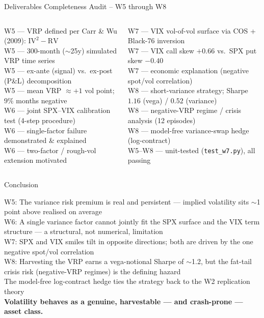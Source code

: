 \documentclass[aspectratio=169, 11pt]{beamer}
\begin{document}
\begin{frame}{Deliverables Completeness Audit -- W5 through W8}
\small
\begin{columns}[T]
\checkmark\; W5 --- VRP defined per Carr \& Wu (2009): $\mathrm{IV}^2 - \mathrm{RV}$\\[2pt]
\checkmark\; W5 --- 300-month ($\sim$25y) simulated VRP time series\\[2pt]
\checkmark\; W5 --- ex-ante (signal) vs.\ ex-post (P\&L) decomposition\\[2pt]
\checkmark\; W5 --- mean VRP $\approx +1$ vol point; $9\%$ months negative\\[2pt]
\checkmark\; W6 --- joint SPX--VIX calibration test (4-step procedure)\\[2pt]
\checkmark\; W6 --- single-factor failure demonstrated \& explained\\[2pt]
\checkmark\; W6 --- two-factor / rough-vol extension motivated

\checkmark\; W7 --- VIX vol-of-vol surface via COS + Black-76 inversion\\[2pt]
\checkmark\; W7 --- VIX call skew $+0.66$ vs.\ SPX put skew $-0.40$\\[2pt]
\checkmark\; W7 --- economic explanation (negative spot/vol correlation)\\[2pt]
\checkmark\; W8 --- short-variance strategy; Sharpe $1.16$ (vega) / $0.52$ (variance)\\[2pt]
\checkmark\; W8 --- negative-VRP regime / crisis analysis (12 episodes)\\[2pt]
\checkmark\; W8 --- model-free variance-swap hedge (log-contract)\\[2pt]
\checkmark\; W5--W8 --- unit-tested (\texttt{test\_w7.py}), all passing
\end{columns}
\end{frame}

\begin{frame}{Conclusion}
\begin{center}
\begin{minipage}{0.88\textwidth}
  \checkmark\; W5: The variance risk premium is real and persistent --- implied volatility sits $\sim$1 point above realised on average\\[4pt]
  \checkmark\; W6: A single variance factor cannot jointly fit the SPX surface and the VIX term structure --- a structural, not numerical, limitation\\[4pt]
  \checkmark\; W7: SPX and VIX smiles tilt in opposite directions; both are driven by the one negative spot/vol correlation\\[4pt]
  \checkmark\; W8: Harvesting the VRP earns a vega-notional Sharpe of $\sim$1.2, but the fat-tail crisis risk (negative-VRP regimes) is the defining hazard\\[4pt]
  \checkmark\; The model-free log-contract hedge ties the strategy back to the W2 replication theory\\[12pt]
  \textbf{Volatility behaves as a genuine, harvestable --- and crash-prone --- asset class.}
\end{minipage}
\end{center}
\end{frame}
\end{document}
